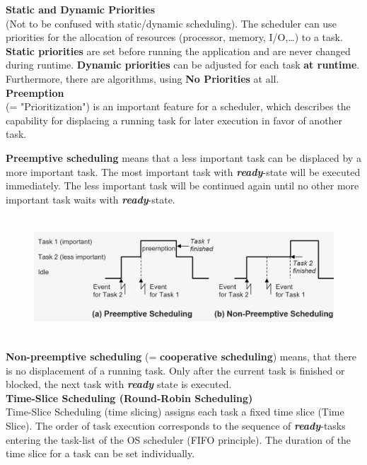 {\rot\bf Static and Dynamic Priorities}\\

(Not to be confused with static/dynamic scheduling). The scheduler can use priorities for the allocation of resources (processor, memory, I/O,{\dots}) to a task. \textbf{Static priorities} are set before running the application and are never changed during runtime. \textbf{Dynamic priorities} can be adjusted for each task \textbf{at runtime}. Furthermore, there are algorithms, using \textbf{No Priorities} at all. \\

\textbf{Preemption}\\

(= "Prioritization") is an important feature for a scheduler, which describes the capability for displacing a running task for later execution in favor of another task. 

\textbf{Preemptive scheduling }means that a less important task can be displaced by a more important task. The most important task with \textbf{\textit{ready}}-state will be executed immediately. The less important task will be continued again until no other more important task waits with \textbf{\textit{ready}}-state.

	\begin{figure}[h]
    \centering
    \includegraphics[width=15cm, height=4.5cm]{Images/image89.png}
    \label{fig:Fig }
    \end{figure}

\textbf{Non-preemptive scheduling} (= \textbf{cooperative scheduling}) means, that there is no displacement of a running task. Only after the current task is finished or blocked, the next task with \textbf{\textit{ready}} state is executed.\\


{\rot\bf Time-Slice Scheduling (Round-Robin Scheduling)}\\

Time-Slice Scheduling (time slicing) assigns each task a fixed time slice (Time Slice). The order of task execution corresponds to the sequence of \textbf{\textit{ready}}-tasks entering the task-list of the OS scheduler (FIFO principle). The duration of the time slice for a task can be set individually.\\

